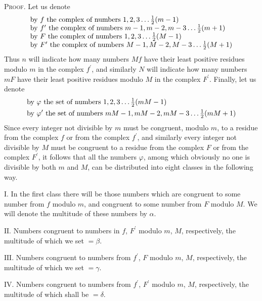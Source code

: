 \documentclass[twoside,12pt]{memoir}
\let\oldfrac\frac
\def\frac#1#2{\mathchoice{\tfrac{#1}{#2}}{\oldfrac{#1}{#2}}{\genfrac{}{}{}{2}{#1}{#2\mathstrut}}{\genfrac{}{}{}{3}{#1}{#2\mathstrut}}}
\begin{document}
\textsc{Proof.} Let us denote
\[\begin{array}{l}
\text{by }f\text{ the complex of numbers }1,2,3 \ldots \frac{1}{2}(m-1) \\
\text{by }f^{\prime}\text{ the complex of numbers }m-1, m-2, m-3 \ldots \frac{1}{2}(m+1) \\
\text{by }F\text{ the complex of numbers }1,2,3 \ldots \frac{1}{2}({M}-1) \\
\text{by }F^{\prime}\text{ the complex of numbers }M-1, M-2, M-3 \ldots \frac{1}{2}(M+1)\\ 
\end{array}\]
Thus \(n\) will indicate how many numbers \(M f\) have their least positive residues modulo \(m\) in the complex \(f^{\prime}\), and similarly \(N\) will indicate how many numbers \(m F\) have their least positive residues modulo \(M\) in the complex \(F^{\prime}\). Finally, let us denote\\
\[\begin{aligned}
&\text{by }\varphi\text{ the set of numbers }1, 2, 3 \ldots \frac{1}{2}(m M-1)\\
&\text{by }\varphi^{\prime}\text{ the set of numbers }m M-1, m M-2, m M-3 \ldots \frac{1}{2}(m M+1)
\end{aligned}\]
Since every integer not divisible by \(m\) must be congruent, modulo \(m\), to a residue from the complex \(f\) or from the complex \(f^{\prime}\), and similarly every integer not divisible by \(M\) must be congruent to a residue from the complex \(F\) or from the complex \(F^{\prime}\), it follows that all the numbers \(\varphi\), among which obviously no one is divisible by both \(m\) and \(M\), can be distributed into eight classes in the following way.
%

\(\text{I.}\) In the first class there will be those numbers which are congruent to some number from \(f\) modulo \(m\), and congruent to some number from \(F\) modulo \(M\). We will denote the multitude of these numbers by \(\alpha\).

\(\text{II.}\) Numbers congruent to numbers in \(f\), \(F^{\prime}\) modulo \(m\), \(M\), respectively, the multitude of which we set \(=\beta\).

\(\text{III.}\) Numbers congruent to numbers from \(f^{\prime}\), \(F\) modulo \(m\), \(M\), respectively, the multitude of which we set \(=\gamma\).

\(\text{IV.}\) Numbers congruent to numbers from \(f^{\prime}\), \(F^{\prime}\) modulo \(m\), \(M\), respectively, the multitude of which shall be \(=\delta\).
\end{document}
